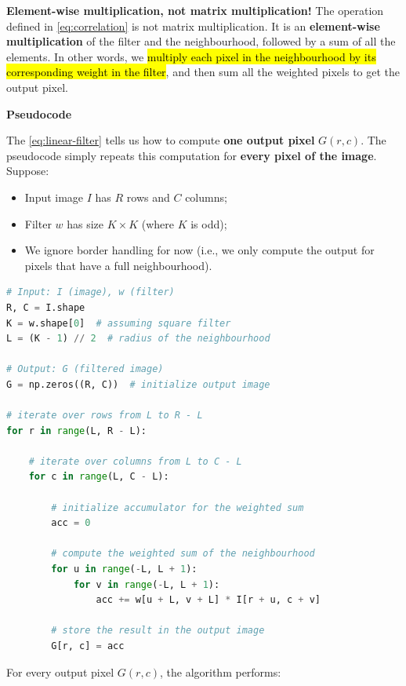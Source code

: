 \highspace
\textcolor{Red2}{ \textbf{Element-wise multiplication, not matrix multiplication!}} The operation defined in \autoref{eq:correlation} is not matrix multiplication. It is an \textbf{element-wise multiplication} of the filter and the neighbourhood, followed by a sum of all the elements. In other words, we \hl{multiply each pixel in the neighbourhood by its corresponding weight in the filter}, and then sum all the weighted pixels to get the output pixel.

\highspace
\begin{flushleft}
    \textcolor{Green3}{ \textbf{Pseudocode}}
\end{flushleft}
The \autoref{eq:linear-filter} tells us how to compute \textbf{one output pixel} $G\left(r,c\right)$. The pseudocode simply repeats this computation for \textbf{every pixel of the image}. Suppose:
\begin{itemize}
    \item Input image $I$ has $R$ rows and $C$ columns;
    \item Filter $w$ has size $K \times K$ (where $K$ is odd);
    \item We ignore border handling for now (i.e., we only compute the output for pixels that have a full neighbourhood).
\end{itemize}
\begin{lstlisting}[language=Python, caption={Pseudocode for correlation.}, label={lst:correlation-pseudocode}]
# Input: I (image), w (filter)
R, C = I.shape
K = w.shape[0]  # assuming square filter
L = (K - 1) // 2  # radius of the neighbourhood

# Output: G (filtered image)
G = np.zeros((R, C))  # initialize output image

# iterate over rows from L to R - L
for r in range(L, R - L):

    # iterate over columns from L to C - L
    for c in range(L, C - L):

        # initialize accumulator for the weighted sum
        acc = 0
    
        # compute the weighted sum of the neighbourhood
        for u in range(-L, L + 1):
            for v in range(-L, L + 1):
                acc += w[u + L, v + L] * I[r + u, c + v]
    
        # store the result in the output image
        G[r, c] = acc
\end{lstlisting}
\noindent
For every output pixel $G\left(r,c\right)$, the algorithm performs:
